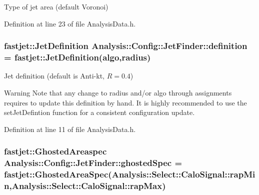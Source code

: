 Type of jet area (default Voronoi) 



Definition at line 23 of file Analysis\+Data.\+h.

\subsubsection[{\texorpdfstring{definition}{definition}}]{\setlength{\rightskip}{0pt plus 5cm}fastjet\+::\+Jet\+Definition Analysis\+::\+Config\+::\+Jet\+Finder\+::definition = fastjet\+::\+Jet\+Definition({\bf algo},{\bf radius})\hspace{0.3cm}{\ttfamily [static]}}\hypertarget{namespaceAnalysis_1_1Config_1_1JetFinder_aba0bf7a22523481843fb40dd34488c8c}{}\label{namespaceAnalysis_1_1Config_1_1JetFinder_aba0bf7a22523481843fb40dd34488c8c}


Jet definition (default is Anti-\/kt, $ R = 0.4 $) 

\begin{DoxyWarning}{Warning}
Note that any change to {\ttfamily radius} and/or {\ttfamily algo} through assignments requires to update this definition by hand. It is highly recommended to use the {\ttfamily set\+Jet\+Defintion} function for a consistent configuration update. 
\end{DoxyWarning}


Definition at line 11 of file Analysis\+Data.\+h.

\subsubsection[{\texorpdfstring{ghosted\+Spec}{ghostedSpec}}]{\setlength{\rightskip}{0pt plus 5cm}fastjet\+::\+Ghosted\+Areaspec Analysis\+::\+Config\+::\+Jet\+Finder\+::ghosted\+Spec = fastjet\+::\+Ghosted\+Area\+Spec({\bf Analysis\+::\+Select\+::\+Calo\+Signal\+::rap\+Min},{\bf Analysis\+::\+Select\+::\+Calo\+Signal\+::rap\+Max})\hspace{0.3cm}{\ttfamily [static]}}\hypertarget{namespaceAnalysis_1_1Config_1_1JetFinder_a69fd2afa3ea463941c31076604b1f430}{}\label{namespaceAnalysis_1_1Config_1_1JetFinder_a69fd2afa3ea463941c31076604b1f430}


